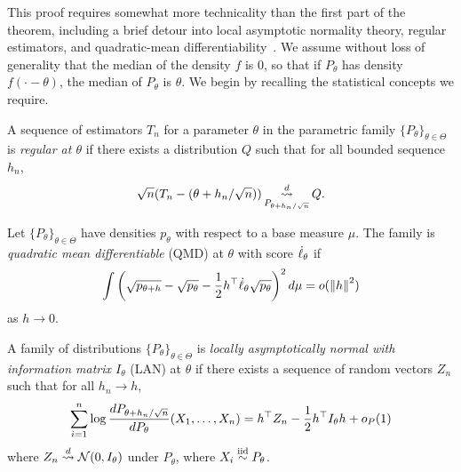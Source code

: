 This proof requires somewhat more technicality than the first part of the
theorem, including a brief detour into local asymptotic normality theory,
regular estimators, and quadratic-mean
differentiability~\cite[cf.]{VanDerVaart98}.
We assume without loss of generality that the median of the density
$f$ is 0, so that if $P_\theta$ has density $f(\cdot - \theta)$, the
median of $P_\theta$ is $\theta$.
We begin by recalling the statistical concepts we require.
\begin{definition}
  \label{definition:regular-estimator}
  A sequence of estimators $T_n$ for a parameter $\theta$ in the parametric
  family $\{P_\theta\}_{\theta \in \Theta}$ is \emph{regular at $\theta$} if
  there exists a distribution $Q$ such that for all bounded sequence
  $h_n$,
  \begin{equation*}
    \sqrt{n}(T_n - (\theta + h_n / \sqrt{n}))
    \mathop{\stackrel{d}{\rightsquigarrow}}_{P_{\theta + h_n/\sqrt{n}}}
    Q.
  \end{equation*}
\end{definition}
\begin{definition}
  \label{definition:qmd}
  Let $\{P_\theta\}_{\theta \in \Theta}$ have densities $p_\theta$
  with respect to a base measure $\mu$. The family
  is \emph{quadratic mean differentiable} (QMD) at
  $\theta$ with score $\dot{\ell}_\theta$ if
  \begin{equation}
    \label{eqn:qmd}
    \int \left(\sqrt{p_{\theta + h}} - \sqrt{p_\theta}
    - \frac{1}{2} h^\top \dot{\ell}_\theta\sqrt{p_\theta} \right)^2 d\mu
    = o(\left\|{h}\right\|^2)
  \end{equation}
  as $h \to 0$.
\end{definition}
\begin{definition}
  \label{definition:lan}
  A family of distributions $\{P_\theta\}_{\theta \in \Theta}$ is
  \emph{locally asymptotically normal with information matrix $I_\theta$} (LAN)
  at
  $\theta$ if there exists a sequence of random vectors $Z_n$ such that for
  all $h_n \to h$,
  \begin{equation*}
    \sum_{i = 1}^n \log \frac{dP_{\theta + h_n/\sqrt{n}}}{dP_\theta}
    (X_1, \ldots, X_n)
    = h^\top Z_n - \frac{1}{2} h^\top I_\theta h + o_P(1)
  \end{equation*}
  where $Z_n \stackrel{d}{\rightsquigarrow} \mathcal{N}(0, I_\theta)$ under $P_\theta$, where
  $X_i \stackrel{\textup{iid}}{\sim} P_\theta$.
\end{definition}

